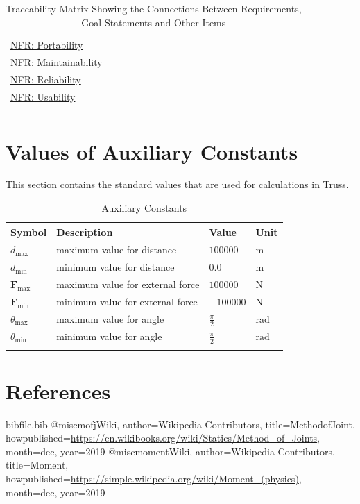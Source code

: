 \documentclass[12pt]{article}
\begin{document}
\begin{longtable}{l l l l l l l l l l l l l l l l l l l l l}
\\
\hyperref[portable]{NFR: Portability} &  &  &  &  &  &  &  &  &  &  &  &  &  &  &  &  &  &  &  & 
\\
\hyperref[maintainable]{NFR: Maintainability} &  &  &  &  &  &  &  &  &  &  &  &  &  &  &  &  &  &  &  & 
\\
\hyperref[reliable]{NFR: Reliability} &  &  &  &  &  &  &  &  &  &  &  &  &  &  &  &  &  &  &  & 
\\
\hyperref[usable]{NFR: Usability} &  &  &  &  &  &  &  &  &  &  &  &  &  &  &  &  &  &  &  & 
\\
\bottomrule
\caption{Traceability Matrix Showing the Connections Between Requirements, Goal Statements and Other Items}
\label{Table:TraceMatAllvsR}
\end{longtable}
\section{Values of Auxiliary Constants}
\label{Sec:AuxConstants}
This section contains the standard values that are used for calculations in Truss.

\begin{longtable}{l l l l}
\toprule
\textbf{Symbol} & \textbf{Description} & \textbf{Value} & \textbf{Unit}
\\
\midrule
\endhead
${d_{\text{max}}}$ & maximum  value for distance & $100000$ & ${\text{m}}$
\\
${d_{\text{min}}}$ & minimum  value for distance & $0.0$ & ${\text{m}}$
\\
${\mathbf{F}_{\text{max}}}$ & maximum  value for external force & $100000$ & ${\text{N}}$
\\
${\mathbf{F}_{\text{min}}}$ & minimum  value for external force & $-100000$ & ${\text{N}}$
\\
${θ_{\text{max}}}$ & maximum  value for angle & $\frac{π}{2}$ & ${\text{rad}}$
\\
${θ_{\text{min}}}$ & minimum  value for angle & $\frac{π}{2}$ & ${\text{rad}}$
\\
\bottomrule
\caption{Auxiliary Constants}
\label{Table:TAuxConsts}
\end{longtable}
\section{References}
\label{Sec:References}
\begin{filecontents*}{bibfile.bib}
@misc{mofjWiki,
author={Wikipedia Contributors},
title={MethodofJoint},
howpublished={\url{https://en.wikibooks.org/wiki/Statics/Method\_of\_Joints}},
month=dec,
year={2019}}
@misc{momentWiki,
author={Wikipedia Contributors},
title={Moment},
howpublished={\url{https://simple.wikipedia.org/wiki/Moment\_(physics)}},
month=dec,
year={2019}}
\end{filecontents*}
\nocite{*}
\printbibliography[heading=none]
\end{document}
